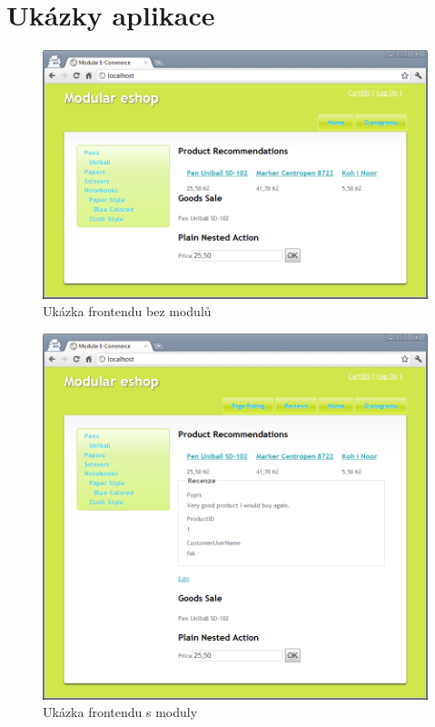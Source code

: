 \documentclass[11pt,twoside,a4paper]{book}
\begin{document}
\begin{description}
\end{description}


\chapter{Ukázky aplikace}

\begin{figure}[h!]
\begin{center}
\includegraphics[scale=0.65,angle=0]{figures/frontend1}
\caption{Ukázka frontendu bez modulů}
\end{center}
\end{figure}

\begin{figure}[h!]
\begin{center}
\includegraphics[scale=0.65,angle=0]{figures/frontend2}
\caption{Ukázka frontendu s moduly}
\end{center}
\end{figure}
\end{document}
